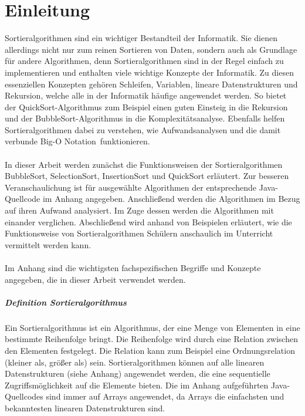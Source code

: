 \documentclass[./entry.tex]{subfiles}
\begin{document}
    \chapter{Einleitung}

    Sortieralgorithmen sind ein wichtiger Bestandteil der Informatik.
    Sie dienen allerdings nicht nur zum reinen Sortieren von Daten,
    sondern auch als Grundlage für andere Algorithmen,
    denn Sortieralgorithmen sind in der Regel einfach zu implementieren
    und enthalten viele wichtige Konzepte der Informatik.
    Zu diesen essenziellen Konzepten gehören Schleifen,
    Variablen, lineare Datenstrukturen und Rekursion, welche
    alle in der Informatik häufige angewendet werden.
    So bietet der QuickSort-Algorithmus zum Beispiel einen guten Einsteig in die Rekursion
    und der BubbleSort-Algorithmus in die Komplexitätsanalyse.
    Ebenfalls helfen Sortieralgorithmen dabei zu verstehen,
    wie Aufwandsanalysen und die damit verbunde \dq Big-O Notation\dq\ funktionieren.
    \\\\
    In dieser Arbeit werden zunächst die Funktionsweisen der Sortieralgorithmen
    BubbleSort, SelectionSort, InsertionSort und QuickSort erläutert.
    Zur besseren Veranschaulichung ist für ausgewählte Algorithmen der entsprechende Java-Quellcode im Anhang angegeben.
    Anschließend werden die Algorithmen im Bezug auf ihren Aufwand analysiert.
    Im Zuge dessen werden die Algorithmen mit einander verglichen.
    Abschließend wird anhand von Beispielen erläutert, wie die Funktionsweise
    von Sortieralgorithmen Schülern anschaulich im Unterricht vermittelt werden kann.
    \\\\
    Im Anhang sind die wichtigsten fachspezifischen Begriffe und Konzepte
    angegeben, die in dieser Arbeit verwendet werden. \\

    \paragraph{Definition Sortieralgorithmus}
    Ein Sortieralgorithmus ist ein Algorithmus, der eine Menge von Elementen in eine bestimmte Reihenfolge bringt.
    Die Reihenfolge wird durch eine Relation zwischen den Elementen festgelegt.
    Die Relation kann zum Beispiel eine Ordnungsrelation (kleiner als, größer als) sein.
    Sortieralgorithmen können auf alle linearen Datenstrukturen (siehe Anhang) angewendet werden,
    die eine sequentielle Zugriffsmöglichkeit auf die Elemente bieten.
    Die im Anhang aufgeführten Java-Quellcodes sind immer auf Arrays angewendet,
    da Arrays die einfachsten und bekanntesten linearen Datenstrukturen sind.
\end{document}
